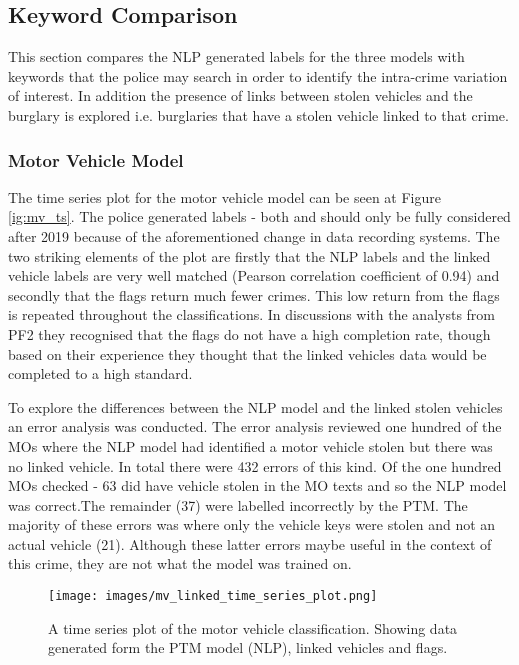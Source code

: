 

\subsection{Keyword Comparison} This section compares the NLP generated labels for the three models with keywords that the police may search in order to identify the intra-crime variation of interest. In addition the presence of links between stolen vehicles and the burglary is explored i.e. burglaries that have a stolen vehicle linked to that crime.

\subsubsection{Motor Vehicle Model} The time series plot for the motor vehicle model can be seen at Figure \ref{ig:mv_ts}. The police generated labels - both  and  should only be fully considered after 2019 because of the aforementioned change in data recording systems. The two striking elements of the plot are firstly that the NLP labels and the linked vehicle labels are very well matched (Pearson correlation coefficient of 0.94) and secondly that the flags return much fewer crimes. This low return from the flags is repeated throughout the classifications. In discussions with the analysts from PF2 they recognised that the flags do not have a high completion rate, though based on their experience they thought that the linked vehicles data would be completed to a high standard. 

To explore the differences between the NLP model and the linked stolen vehicles an error analysis was conducted. The error analysis reviewed one hundred of the MOs where the NLP model had identified a motor vehicle stolen but there was no linked vehicle. In total there were 432 errors of this kind. Of the one hundred MOs checked - 63 did have vehicle stolen in the MO texts and so the NLP model was correct.The remainder (37) were labelled incorrectly by the PTM. The majority of these errors was where only the vehicle keys were stolen and not an actual vehicle (21). Although these latter errors maybe useful in the context of this crime, they are not what the model was trained on.   


\begin{figure}
  \texttt{[image: images/mv\_linked\_time\_series\_plot.png]}
  \caption[Motor vehicle model time series plot]{A time series plot of the motor vehicle classification. Showing data generated form the PTM model (NLP), linked vehicles and flags.}
  \label{fig:mv_ts}
\end{figure}

